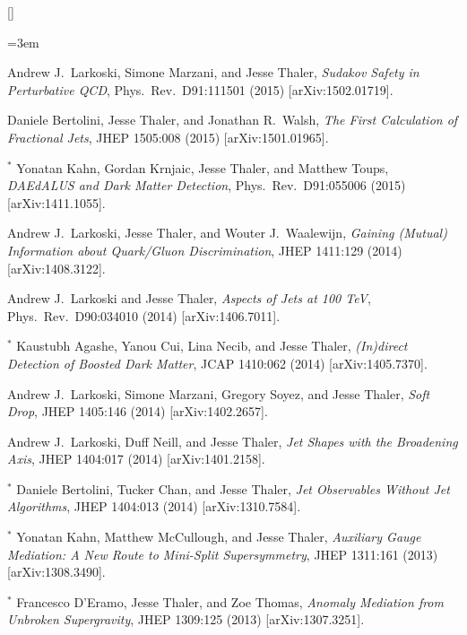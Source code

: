 \begin{list}{[]\addtocounter{jessecount}{-1}}{\leftmargin=3em \itemsep=4pt}
\item
 Andrew J.\ Larkoski, Simone Marzani, and Jesse Thaler,
\emph{Sudakov Safety in Perturbative QCD},
Phys.\ Rev.\ D91:111501 (2015)
[arXiv:1502.01719].

\item
 Daniele Bertolini, Jesse Thaler, and Jonathan R.\ Walsh,
\emph{The First Calculation of Fractional Jets},
JHEP 1505:008 (2015)
[arXiv:1501.01965].

\item
${}^\ast$ Yonatan Kahn, Gordan Krnjaic, Jesse Thaler, and Matthew Toups,
\emph{DAEdALUS and Dark Matter Detection},
Phys.\ Rev.\ D91:055006 (2015)
[arXiv:1411.1055].

\item
 Andrew J.\ Larkoski, Jesse Thaler, and Wouter J.\ Waalewijn,
\emph{Gaining (Mutual) Information about Quark/Gluon Discrimination},
JHEP 1411:129 (2014)
[arXiv:1408.3122].

\item
 Andrew J.\ Larkoski and Jesse Thaler,
\emph{Aspects of Jets at 100 TeV},
Phys.\ Rev.\ D90:034010 (2014)
[arXiv:1406.7011].

\item
${}^\ast$ Kaustubh Agashe, Yanou Cui, Lina Necib, and Jesse Thaler,
\emph{(In)direct Detection of Boosted Dark Matter},
JCAP 1410:062 (2014)
[arXiv:1405.7370].

\item
 Andrew J.\ Larkoski, Simone Marzani, Gregory Soyez, and Jesse Thaler,
\emph{Soft Drop},
JHEP 1405:146 (2014)
[arXiv:1402.2657].

\item
 Andrew J.\ Larkoski, Duff Neill, and Jesse Thaler,
\emph{Jet Shapes with the Broadening Axis},
JHEP 1404:017 (2014)
[arXiv:1401.2158].

\item
${}^\ast$ Daniele Bertolini, Tucker Chan, and Jesse Thaler,
\emph{Jet Observables Without Jet Algorithms},
JHEP 1404:013 (2014)
[arXiv:1310.7584].

\item
${}^\ast$ Yonatan Kahn, Matthew McCullough, and Jesse Thaler,
\emph{Auxiliary Gauge Mediation: A New Route to Mini-Split Supersymmetry},
JHEP 1311:161 (2013)
[arXiv:1308.3490].

\item
${}^\ast$ Francesco D'Eramo, Jesse Thaler, and Zoe Thomas,
\emph{Anomaly Mediation from Unbroken Supergravity},
JHEP 1309:125 (2013)
[arXiv:1307.3251].


\end{list}
